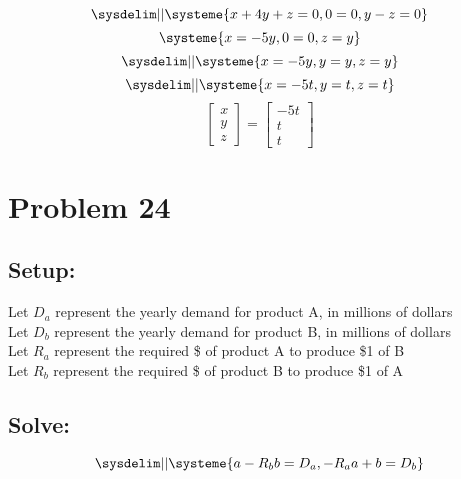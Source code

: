 \documentclass{article}
\begin{document}
\begin{equation*}
    \sysdelim||\systeme{
        x + 4y + z = 0,
        0 = 0,
        y - z = 0
    }
\end{equation*}
\begin{equation*}
    \systeme{
        x = - 5y,
        0 = 0 ,
        z = y
    }
\end{equation*}
\begin{equation*}
    \sysdelim||\systeme{
        x = - 5y,
        y = y ,
        z = y
    }
\end{equation*}
\begin{equation*}
    \sysdelim||\systeme{
        x = - 5t,
        y = t ,
        z = t
    }
\end{equation*}
\begin{equation*}
\begin{bmatrix}
    x\\y\\z
\end{bmatrix}
= 
\begin{bmatrix}
    -5t\\t\\t
\end{bmatrix}
\end{equation*}
\noindent\makebox[\linewidth]{\rule{16cm}{0.4pt}}
\section*{Problem 24}
\subsection*{Setup: }
Let $D_a$ represent the yearly demand for product A, in millions of dollars\\
Let $D_b$ represent the yearly demand for product B, in millions of dollars\\
Let $R_a$ represent the required \$ of product A to produce \$1 of B\\
Let $R_b$ represent the required \$ of product B to produce \$1 of A
\subsection*{Solve: }
$$
\sysdelim||\systeme{
    a - R_b b = D_a,
    -R_a a + b = D_b
}
$$
\end{document}
